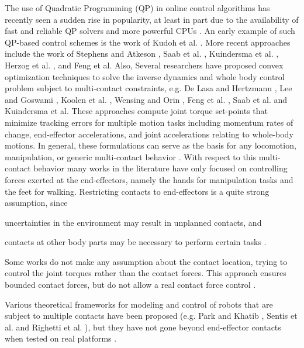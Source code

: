 	The use of Quadratic Programming (QP) in online control algorithms has recently seen a sudden
	rise in popularity,	at least in part due to the availability of fast and reliable QP solvers
	and more powerful CPUs \cite{Koolen_IJHR2016}.
	An early example of such QP-based control schemes is the work of Kudoh et al. \cite{Kudoh_IROS2002}.
	More recent approaches include the work of Stephens and Atkeson \cite{Stephens_IROS2010},
	Saab et al. \cite{Saab_TransRobotics2013}, Kuindersma et al. \cite{Kuindersma_ICRA2014},
	Herzog et al. \cite{Herzog_IROS2014}, and Feng et al. \cite{Feng_Humanoids2014}
	Also, Several researchers have proposed convex optimization techniques to solve the inverse dynamics and
	whole body control problem subject to multi-contact constraints, e.g. De Lasa and Hertzmann
	\cite{DeLasa_IROS2009}, Lee and Goswami \cite{LeeS_IROS2010}, Koolen et al. \cite{Koolen_Humanoids2013},
	Wensing and Orin \cite{Wensing_ICRA2013}, Feng et al. \cite{Feng_Humanoids2014}, Saab et al.
	\cite{Saab_TransRobotics2013} and Kuindersma et al. \cite{Kuindersma_ICRA2014}
	These approaches compute joint torque set-points that minimize tracking errors for multiple motion
	tasks including momentum rates of change, end-effector accelerations, and joint accelerations relating
	to whole-body motions.
	In general, these formulations can serve as the basis for any locomotion, manipulation, or generic
	multi-contact behavior \cite{Hopkins_ICRA2015}.
	With respect to this multi-contact behavior many works in the literature have only focused on
	controlling forces exerted at the	end-effectors, namely the hands for manipulation tasks and
	the feet for walking.
	Restricting contacts to end-effectors is a quite strong assumption, since
	\begin{inparaenum}
		\item uncertainties in the environment may result in unplanned contacts,
					and
		\item contacts at other body parts may be necessary to perform certain tasks
					\cite{DelPrete_PhDThesis2013}.
	\end{inparaenum}
	
	Some works do not make any assumption about the contact location, trying to control the joint
	torques	rather than the contact forces.
	This approach ensures bounded contact forces, but do not allow a real contact force control
	\cite{DelPrete_PhDThesis2013}.
	
	Various theoretical frameworks for modeling and control of robots that are subject to multiple
	contacts have been proposed (e.g. Park and Khatib \cite{Park_ICRA2006}, Sentis et al.
	\cite{Sentis_IROS2009} and Righetti et al. \cite{Righetti_ICRA2011}), but they have not
	gone beyond end-effector contacts when tested	on real platforms \cite{DelPrete_PhDThesis2013}.


